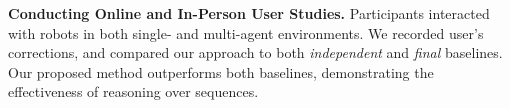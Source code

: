 \smallskip

\noindent\textbf{Conducting Online and In-Person User Studies.} Participants interacted with robots in both single- and multi-agent environments. We recorded user's corrections, and compared our approach to both \textit{independent} and \textit{final} baselines. Our proposed method outperforms both baselines, demonstrating the effectiveness of reasoning over sequences.











